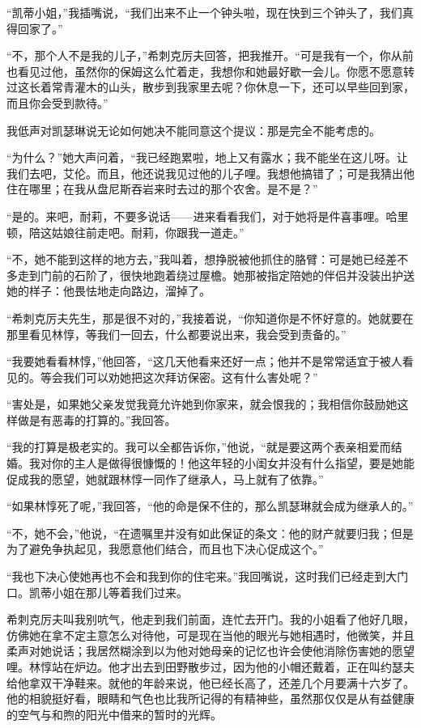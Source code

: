 \par “凯蒂小姐，”我插嘴说，“我们出来不止一个钟头啦，现在快到三个钟头了，我们真得回家了。”
\par “不，那个人不是我的儿子，”希刺克厉夫回答，把我推开。“可是我有一个，你从前也看见过他，虽然你的保姆这么忙着走，我想你和她最好歇一会儿。你愿不愿意转过这长着常青灌木的山头，散步到我家里去呢？你休息一下，还可以早些回到家，而且你会受到款待。”
\par 我低声对凯瑟琳说无论如何她决不能同意这个提议：那是完全不能考虑的。
\par “为什么？”她大声问着，“我已经跑累啦，地上又有露水；我不能坐在这儿呀。让我们去吧，艾伦。而且，他还说我见过他的儿子哩。我想他搞错了；可是我猜出他住在哪里；在我从盘尼斯吞岩来时去过的那个农舍。是不是？”
\par “是的。来吧，耐莉，不要多说话——进来看看我们，对于她将是件喜事哩。哈里顿，陪这姑娘往前走吧。耐莉，你跟我一道走。”
\par “不，她不能到这样的地方去，”我叫着，想挣脱被他抓住的胳臂：可是她已经差不多走到门前的石阶了，很快地跑着绕过屋檐。她那被指定陪她的伴侣并没装出护送她的样子：他畏怯地走向路边，溜掉了。
\par “希刺克厉夫先生，那是很不对的，”我接着说，“你知道你是不怀好意的。她就要在那里看见林惇，等我们一回去，什么都要说出来，我会受到责备的。”
\par “我要她看看林惇，”他回答，“这几天他看来还好一点；他并不是常常适宜于被人看见的。等会我们可以劝她把这次拜访保密。这有什么害处呢？”
\par “害处是，如果她父亲发觉我竟允许她到你家来，就会恨我的；我相信你鼓励她这样做是有恶毒的打算的。”我回答。
\par “我的打算是极老实的。我可以全都告诉你，”他说，“就是要这两个表亲相爱而结婚。我对你的主人是做得很慷慨的！他这年轻的小闺女并没有什么指望，要是她能促成我的愿望，她就跟林惇一同作了继承人，马上就有了依靠。”
\par “如果林惇死了呢，”我回答，“他的命是保不住的，那么凯瑟琳就会成为继承人的。”
\par “不，她不会，”他说，“在遗嘱里并没有如此保证的条文：他的财产就要归我；但是为了避免争执起见，我愿意他们结合，而且也下决心促成这个。”
\par “我也下决心使她再也不会和我到你的住宅来。”我回嘴说，这时我们已经走到大门口。凯蒂小姐在那儿等着我们过来。
\par 希刺克厉夫叫我别吭气，他走到我们前面，连忙去开门。我的小姐看了他好几眼，仿佛她在拿不定主意怎么对待他，可是现在当他的眼光与她相遇时，他微笑，并且柔声对她说话；我居然糊涂到以为他对她母亲的记忆也许会使他消除伤害她的愿望哩。林惇站在炉边。他才出去到田野散步过，因为他的小帽还戴着，正在叫约瑟夫给他拿双干净鞋来。就他的年龄来说，他已经长高了，还差几个月要满十六岁了。他的相貌挺好看，眼睛和气色也比我所记得的有精神些，虽然那仅仅是从有益健康的空气与和煦的阳光中借来的暂时的光辉。
